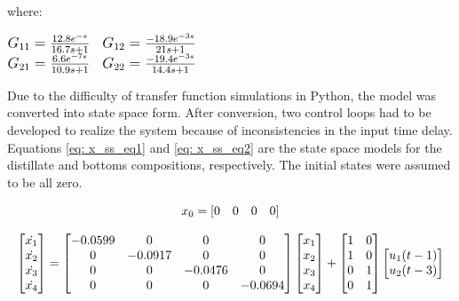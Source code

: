 where: \\
\begin{center}
    $
    \large
    \begin{matrix}
        G_{11} = \frac{12.8e^{-s}}{16.7s + 1}     &     G_{12} = \frac{-18.9e^{-3s}}{21s + 1} \\
        G_{21} = \frac{6.6e^{-7s}}{10.9s + 1}     &     G_{22} = \frac{-19.4e^{-3s}}{14.4s + 1}
    \end{matrix}
    $
\end{center}

Due to the difficulty of transfer function simulations in Python, the model was converted into state space form.  After conversion, two control loops had to be developed to realize the system because of inconsistencies in the input time delay.  Equations \ref{eq: x_ss_eq1} and \ref{eq: x_ss_eq2} are the state space models for the distillate and bottoms compositions, respectively.  The initial states were assumed to be all zero.

\begin{equation}
    \centering
    x_0 = 
    \begin{matrix}
        [0 & 0 & 0 & 0]
    \end{matrix}
\end{equation}

\begin{equation}
    \centering
    \begin{bmatrix}
        \dot{x_1} \\
        \dot{x_2} \\
        \dot{x_3} \\
        \dot{x_4} 
    \end{bmatrix}
    =
    \begin{bmatrix}
        -0.0599     &     0     &     0     &     0 \\
        0           &  -0.0917  &     0     &     0 \\
        0           &     0     &   -0.0476 &     0 \\
        0           &     0     &     0     &  -0.0694
    \end{bmatrix}
    \begin{bmatrix}
        x_1 \\
        x_2 \\
        x_3 \\
        x_4 
    \end{bmatrix}
    +
    \begin{bmatrix}
        1     &     0  \\
        1     &     0  \\
        0     &     1  \\
        0     &     1
    \end{bmatrix}
    \begin{bmatrix}
        u_1(t - 1) \\
        u_2(t - 3)
    \end{bmatrix}
    \label{eq: x_ss_eq1}
\end{equation}

